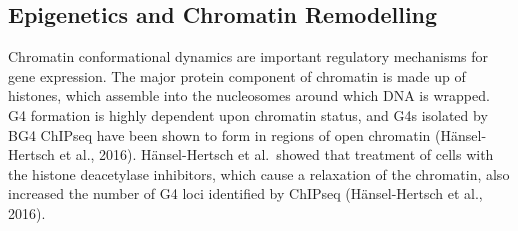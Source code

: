 \documentclass[12pt,a4paper,]{report}
\begin{document}
\newpage

\hypertarget{epigenetics-and-chromatin-remodelling}{%
\subsection{Epigenetics and Chromatin
Remodelling}\label{epigenetics-and-chromatin-remodelling}}

\label{ssec:chromatin}

Chromatin conformational dynamics are important regulatory mechanisms
for gene expression. The major protein component of chromatin is made up
of histones, which assemble into the nucleosomes around which DNA is
wrapped. G4 formation is highly dependent upon chromatin status, and G4s
isolated by BG4 ChIPseq have been shown to form in regions of open
chromatin (Hänsel-Hertsch et al., 2016). Hänsel-Hertsch et al.~showed
that treatment of cells with the histone deacetylase inhibitors, which
cause a relaxation of the chromatin, also increased the number of G4
loci identified by ChIPseq (Hänsel-Hertsch et al., 2016).
\end{document}
